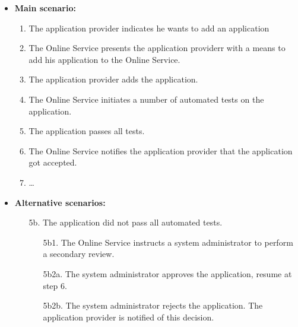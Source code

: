 \documentclass[english]{sareport}
\begin{document}
\begin{itemize}
    \item \textbf{Main scenario:} 
    \begin{enumerate}
       \item The application provider indicates he wants to add an application
       \item The Online Service presents the application providerr with a means to add his application to the Online Service.
       \item The application provider adds the application.
	\item The Online Service initiates a number of automated tests on the application.
	\item The application passes all tests.
	\item The Online Service notifies the application provider that the application got accepted.
       \item \ldots
    \end{enumerate}

    \item \textbf{Alternative scenarios:} 
    \begin{enumerate}
        \item [5b.] The application did not pass all automated tests.
	\begin{enumerate}
		\item [5b1.] The Online Service instructs a system administrator to perform a secondary review.
		\item [5b2a.] The system administrator approves the application, resume at step 6.
		\item [5b2b.] The system administrator rejects the application. The application provider is notified of this decision.
	\end{enumerate}
    \end{enumerate}
\end{itemize}
\end{document}
